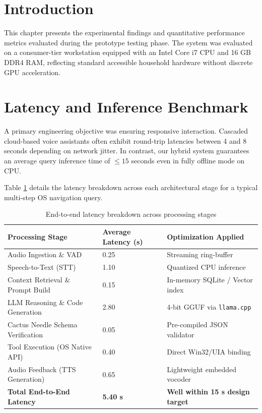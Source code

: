 \documentclass[12pt,a4paper]{report}
\begin{document}
\section{Introduction}
This chapter presents the experimental findings and quantitative performance metrics evaluated during the prototype testing phase. The system was evaluated on a consumer-tier workstation equipped with an Intel Core i7 CPU and 16 GB DDR4 RAM, reflecting standard accessible household hardware without discrete GPU acceleration.

\section{Latency and Inference Benchmark}
A primary engineering objective was ensuring responsive interaction. Cascaded cloud-based voice assistants often exhibit round-trip latencies between 4 and 8 seconds depending on network jitter. In contrast, our hybrid system guarantees an average query inference time of $\le 15$ seconds even in fully offline mode on CPU.

Table \ref{tab:latency_breakdown} details the latency breakdown across each architectural stage for a typical multi-step OS navigation query.

\begin{table}[h!]
	\centering
	\caption{End-to-end latency breakdown across processing stages}
	\label{tab:latency_breakdown}
	\vspace*{8pt}
	\begin{tabular}{p{5.5cm} p{3.5cm} p{4.5cm}}
		\toprule
		\textbf{Processing Stage} & \textbf{Average Latency (s)} & \textbf{Optimization Applied} \\
		\midrule
		Audio Ingestion \& VAD & 0.25 & Streaming ring-buffer \\
		Speech-to-Text (STT) & 1.10 & Quantized CPU inference \\
		Context Retrieval \& Prompt Build & 0.15 & In-memory SQLite / Vector index \\
		LLM Reasoning \& Code Generation & 2.80 & 4-bit GGUF via \texttt{llama.cpp} \\
		Cactus Needle Schema Verification & 0.05 & Pre-compiled JSON validator \\
		Tool Execution (OS Native API) & 0.40 & Direct Win32/UIA binding \\
		Audio Feedback (TTS Generation) & 0.65 & Lightweight embedded vocoder \\
		\midrule
		\textbf{Total End-to-End Latency} & \textbf{5.40 s} & \textbf{Well within 15 s design target} \\
		\bottomrule
	\end{tabular}
\end{table}
\end{document}
